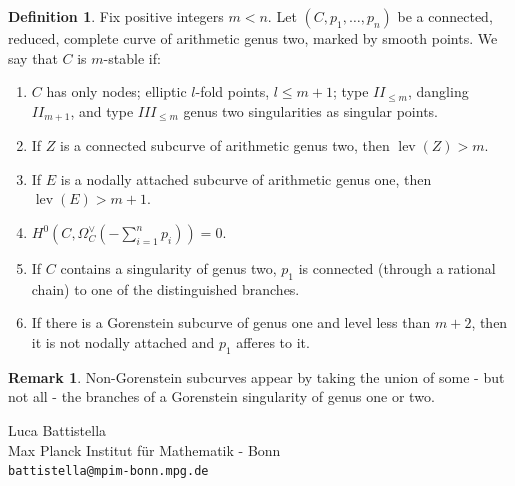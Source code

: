 \documentclass[11pt]{amsart}
\newcommand{\lev}{\operatorname{lev}}
\theoremstyle{plain}
\theoremstyle{definition}
\newtheorem{dfn}[thm]{Definition}
\newtheorem{rem}[thm]{Remark}
\begin{document}
\begin{dfn}
 Fix positive integers $m<n$. Let $(C,p_1,\ldots,p_n)$ be a connected, reduced, complete curve of arithmetic genus two, marked by smooth points. We say that $C$ is $m$-stable if:
 \begin{enumerate}
  \item\label{cond:sing} $C$ has only nodes; elliptic $l$-fold points, $l\leq m+1$; type $I\!I_{\leq m}$, dangling $I\!I_{m+1}$, and type $I\!I\!I_{\leq m}$ genus two singularities as singular points.
  \item\label{cond:lev2} If $Z$ is a connected subcurve of arithmetic genus two, then $\lev(Z)>m$.
  \item\label{cond:lev1} If $E$ is a nodally attached subcurve of arithmetic genus one, then $\lev(E)>m+1$.
  \item\label{cond:aut} $H^0(C,\Omega_C^\vee(-\sum_{i=1}^n p_i))=0$.
  \item\label{cond:p1} If $C$ contains a singularity of genus two, $p_1$ is connected (through a rational chain) to one of the distinguished branches.
  \item If there is a Gorenstein subcurve of genus one and level less than $m+2$, then it is not nodally attached and $p_1$ afferes to it.
 \end{enumerate}
\end{dfn}
\begin{rem}
Non-Gorenstein subcurves appear by taking the union of some - but not all - the branches of a Gorenstein singularity of genus one or two.
\end{rem}






\noindent Luca Battistella\\
Max Planck Institut f\"ur Mathematik - Bonn \\
\texttt{battistella@mpim-bonn.mpg.de}\\
\end{document}
